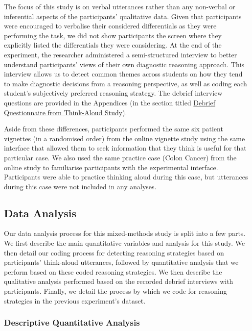 \documentclass[a4paper, nobind]{templates/ociamthesis}
\begin{document}
\hfill\break
The focus of this study is on verbal utterances rather than any non-verbal or inferential aspects of the participants' qualitative data. Given that participants were encouraged to verbalise their considered differentials as they were performing the task, we did not show participants the screen where they explicitly listed the differentials they were considering. At the end of the experiment, the researcher administered a semi-structured interview to better understand participants' views of their own diagnostic reasoning approach. This interview allows us to detect common themes across students on how they tend to make diagnostic decisions from a reasoning perspective, as well as coding each student's subjectively preferred reasoning strategy. The debrief interview questions are provided in the Appendices (in the section titled \hyperref[debriefqs]{Debrief Questionnaire from Think-Aloud Study}).

\hfill\break
Aside from these differences, participants performed the same six patient vignettes (in a randomised order) from the online vignette study using the same interface that allowed them to seek information that they think is useful for that particular case. We also used the same practice case (Colon Cancer) from the online study to familiarise participants with the experimental interface. Participants were able to practice thinking aloud during this case, but utterances during this case were not included in any analyses.

\subsection{Data Analysis}\label{data-analysis-1}

Our data analysis process for this mixed-methods study is split into a few parts. We first describe the main quantitative variables and analysis for this study. We then detail our coding process for detecting reasoning strategies based on participants' think-aloud utterances, followed by quantitative analysis that we perform based on these coded reasoning strategies. We then describe the qualitative analysis performed based on the recorded debrief interviews with participants. Finally, we detail the process by which we code for reasoning strategies in the previous experiment's dataset.

\subsubsection{Descriptive Quantitative Analysis}\label{descriptive-quantitative-analysis}
\end{document}
